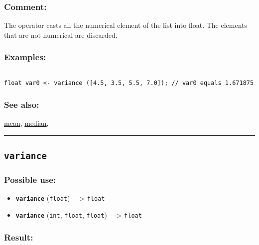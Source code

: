 \documentclass[]{book}
\providecommand{\tightlist}{%
  \setlength{\itemsep}{0pt}\setlength{\parskip}{0pt}}
\theoremstyle{definition}
\theoremstyle{definition}
\theoremstyle{definition}
\theoremstyle{remark}
\begin{document}
\subsubsection{Comment:}\label{comment-105}

The operator casts all the numerical element of the list into float. The
elements that are not numerical are discarded.

\subsubsection{Examples:}\label{examples-378}

\begin{verbatim}
 
float var0 <- variance ([4.5, 3.5, 5.5, 7.0]); // var0 equals 1.671875
\end{verbatim}

\subsubsection{See also:}\label{see-also-217}

\href{OperatorsIM\#mean}{mean}, \href{OperatorsIM\#median}{median},

\begin{center}\rule{0.5\linewidth}{\linethickness}\end{center}

\subsection{\texorpdfstring{\texttt{variance}}{variance}}\label{variance-1}

\subsubsection{Possible use:}\label{possible-use-549}

\begin{itemize}
\tightlist
\item
  \textbf{\texttt{variance}} (\texttt{float}) ---\textgreater{}
  \texttt{float}
\item
  \textbf{\texttt{variance}} (\texttt{int}, \texttt{float},
  \texttt{float}) ---\textgreater{} \texttt{float}
\end{itemize}

\subsubsection{Result:}\label{result-529}
\end{document}
